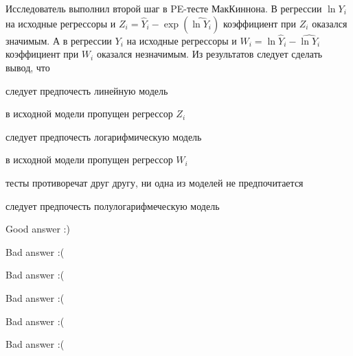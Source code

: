 
\begin{question}
Исследователь выполнил второй шаг в PE-тесте МакКиннона. В регрессии \(\ln Y_i\) на исходные регрессоры и \(Z_i = \hat Y_i - \exp(\widehat{\ln Y_i})\) коэффициент при \(Z_i\) оказался значимым. А в регрессии \(Y_i\) на исходные регрессоры и \(W_i = \ln \hat Y_i - \widehat{\ln Y_i}\) коэффициент при \(W_i\) оказался незначимым. Из результатов следует сделать вывод, что
\begin{answerlist}
  \item следует предпочесть линейную модель
  \item в исходной модели пропущен регрессор \(Z_i\)
  \item следует предпочесть логарифмическую модель
  \item в исходной модели пропущен регрессор \(W_i\)
  \item тесты противоречат друг другу, ни одна из моделей не предпочитается
  \item следует предпочесть полулогарифмеческую модель
\end{answerlist}
\end{question}

\begin{solution}
\begin{answerlist}
  \item Good answer :)
  \item Bad answer :(
  \item Bad answer :(
  \item Bad answer :(
  \item Bad answer :(
  \item Bad answer :(
\end{answerlist}
\end{solution}

